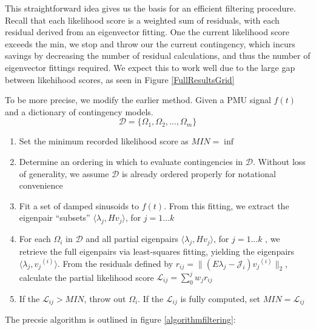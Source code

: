 This straightforward idea gives us the basis for an efficient filtering procedure. Recall that each likelihood score is a weighted sum of residuals, with each residual derived from an eigenvector fitting. One the current likelihood score exceeds the min, we stop and throw our the current contingency, which incurs savings by decreasing the number of residual calculations, and thus the number of eigenvector fittings required. We expect this to work well due to the large gap between likehihood scores, as seen in Figure 
\ref{FullResultsGrid} 


To be more precise, we modify the earlier method. Given a PMU signal $f(t)$ and a dictionary of contingency models. $$ \mathcal{D} =  \{ \Omega_1, \Omega_2, \dots, \Omega_m \} $$
\begin{enumerate}
    \item Set the minimum recorded likelihood score as $MIN = \inf$ 
    \item Determine an ordering in which to evaluate contingencies in $\mathcal{D}$. Without loss of generality, we assume $\mathcal{D}$ is already ordered properly for notational convenience 
    \item Fit a set of damped sinusoids to $f(t)$. From this fitting, we extract the eigenpair ``subsets'' $ \langle {\lambda_j}, {Hv_j} \rangle$, for $j = 1 \dots k$ 
    \item For each $\Omega_i$ in $\mathcal{D}$ and all partial eigenpairs $ \langle {\lambda_j}, {Hv_j} \rangle$, for $j = 1 \dots k$ , we retrieve the full eigenpairs via least-squares fitting, yielding the eigenpairs $\langle {\lambda_j}, {v_j}^{(i)} \rangle$. From the residuals defined by $r_{ij} = \| (E{\lambda_j}-\mathcal{J}_i){v_j}^{(i)} \|_2$, calculate the partial likelihood score $\mathcal{L}_{ij} = \sum_0^j w_j r_{ij}$
    \item If the $\mathcal{L}_{ij} > MIN$, throw out $\Omega_i$. If the $\mathcal{L}_{ij}$ is fully computed, set $MIN = \mathcal{L}_{ij}$ 
\end{enumerate}

The precsie algorithm is outlined in figure \ref{algorithmfiltering}:

